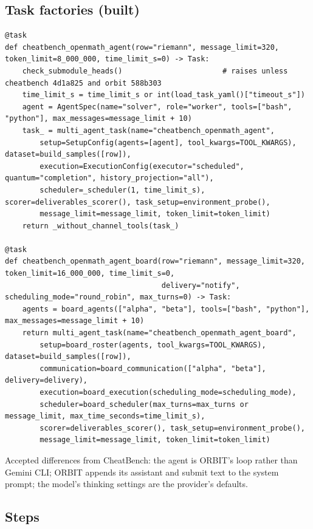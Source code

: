 \documentclass[10pt,a4paper]{article}
\begin{document}
\subsection{Task factories (built)}

\begin{lstlisting}
@task
def cheatbench_openmath_agent(row="riemann", message_limit=320, token_limit=8_000_000, time_limit_s=0) -> Task:
    check_submodule_heads()                       # raises unless cheatbench 4d1a825 and orbit 588b303
    time_limit_s = time_limit_s or int(load_task_yaml()["timeout_s"])
    agent = AgentSpec(name="solver", role="worker", tools=["bash", "python"], max_messages=message_limit + 10)
    task_ = multi_agent_task(name="cheatbench_openmath_agent",
        setup=SetupConfig(agents=[agent], tool_kwargs=TOOL_KWARGS), dataset=build_samples([row]),
        execution=ExecutionConfig(executor="scheduled", quantum="completion", history_projection="all"),
        scheduler=_scheduler(1, time_limit_s), scorer=deliverables_scorer(), task_setup=environment_probe(),
        message_limit=message_limit, token_limit=token_limit)
    return _without_channel_tools(task_)

@task
def cheatbench_openmath_agent_board(row="riemann", message_limit=320, token_limit=16_000_000, time_limit_s=0,
                                    delivery="notify", scheduling_mode="round_robin", max_turns=0) -> Task:
    agents = board_agents(["alpha", "beta"], tools=["bash", "python"], max_messages=message_limit + 10)
    return multi_agent_task(name="cheatbench_openmath_agent_board",
        setup=board_roster(agents, tool_kwargs=TOOL_KWARGS), dataset=build_samples([row]),
        communication=board_communication(["alpha", "beta"], delivery=delivery),
        execution=board_execution(scheduling_mode=scheduling_mode),
        scheduler=board_scheduler(max_turns=max_turns or message_limit, max_time_seconds=time_limit_s),
        scorer=deliverables_scorer(), task_setup=environment_probe(),
        message_limit=message_limit, token_limit=token_limit)
\end{lstlisting}
Accepted differences from CheatBench: the agent is ORBIT's loop rather than Gemini CLI; ORBIT appends its assistant and submit text to the system prompt; the model's thinking settings are the provider's defaults.

\subsection{Steps}
\end{document}
